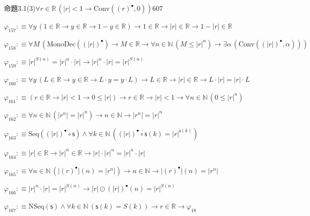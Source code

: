 \begin{fullproof}{命題3.1(3)}{$\forall r \in \mathbb{R}\,(\lvert r \rvert < 1 \to \mathrm{Conv}({(r)^{\bullet}},0))$}{607}
\begin{abbrevlist}
\item $\varphi_{157} :\equiv \forall y\,(1 \in \mathbb{R} \to y \in \mathbb{R} \to 1 - y \in \mathbb{R}) \to 1 \in \mathbb{R} \to \lvert r \rvert \in \mathbb{R} \to 1 - \lvert r \rvert \in \mathbb{R}$
\item $\varphi_{158} :\equiv \forall M\,(\mathrm{MonoDec}({(\lvert r \rvert)^{\bullet}}) \to M \in \mathbb{R} \to \forall n \in \mathbb{N}\,(M \leq {{\lvert r \rvert}^{n}}) \to \exists \alpha\,(\mathrm{Conv}({(\lvert r \rvert)^{\bullet}},\alpha)))$
\item $\varphi_{159} :\equiv {{\lvert r \rvert}^{S(n)}} = {{\lvert r \rvert}^{n}} \cdot \lvert r \rvert \to {{\lvert r \rvert}^{n}} \cdot \lvert r \rvert = {{\lvert r \rvert}^{S(n)}}$
\item $\varphi_{160} :\equiv \forall y\,(L \in \mathbb{R} \to y \in \mathbb{R} \to L \cdot y = y \cdot L) \to L \in \mathbb{R} \to \lvert r \rvert \in \mathbb{R} \to L \cdot \lvert r \rvert = \lvert r \rvert \cdot L$
\item $\varphi_{161} :\equiv (r \in \mathbb{R} \to \lvert r \rvert < 1 \to 0 \leq \lvert r \rvert) \to r \in \mathbb{R} \to \lvert r \rvert < 1 \to \forall n \in \mathbb{N}\,(0 \leq {{\lvert r \rvert}^{n}})$
\item $\varphi_{162} :\equiv \forall n \in \mathbb{N}\,(\lvert {{r}^{n}} \rvert = {{\lvert r \rvert}^{n}}) \to n \in \mathbb{N} \to \lvert {{r}^{n}} \rvert = {{\lvert r \rvert}^{n}}$
\item $\varphi_{163} :\equiv \mathrm{Seq}({(\lvert r \rvert)^{\bullet}} \circ \mathsf{s}) \land \forall k \in \mathbb{N}\,({(\lvert r \rvert)^{\bullet}} \circ \mathsf{s}(k) = {{\lvert r \rvert}^{\mathsf{s}(k)}})$
\item $\varphi_{164} :\equiv \lvert r \rvert \in \mathbb{R} \to {{\lvert r \rvert}^{n}} \in \mathbb{R} \to \lvert r \rvert \cdot {{\lvert r \rvert}^{n}} = {{\lvert r \rvert}^{n}} \cdot \lvert r \rvert$
\item $\varphi_{165} :\equiv \forall n \in \mathbb{N}\,(\lvert {(r)^{\bullet}} \rvert(n) = \lvert {{r}^{n}} \rvert) \to n \in \mathbb{N} \to \lvert {(r)^{\bullet}} \rvert(n) = \lvert {{r}^{n}} \rvert$
\item $\varphi_{166} :\equiv {{\lvert r \rvert}^{n}} \cdot \lvert r \rvert = {{\lvert r \rvert}^{S(n)}} \to \lvert r \rvert \odot {(\lvert r \rvert)^{\bullet}}(n) = {{\lvert r \rvert}^{S(n)}}$
\item $\varphi_{167} :\equiv \mathrm{NSeq}(\mathsf{s}) \land \forall k \in \mathbb{N}\,(\mathsf{s}(k) = S(k)) \to r \in \mathbb{R} \to \varphi_{18}$

\end{abbrevlist}
\end{fullproof}

